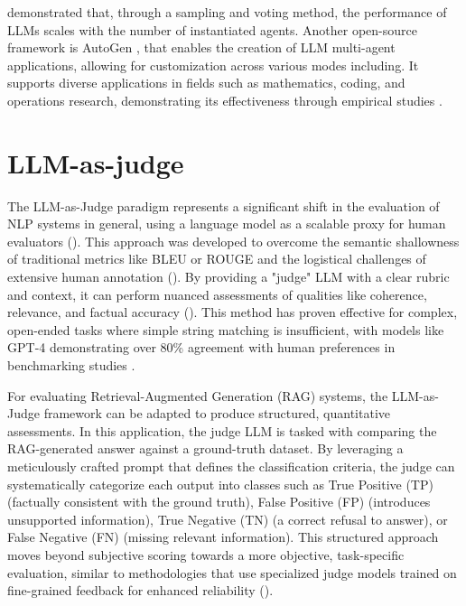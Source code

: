             \citet{Li2024} demonstrated that, through a sampling and voting method, the performance of LLMs scales with the number of instantiated agents.
            Another open-source framework is AutoGen \citep{Wu2023}, that enables the creation of LLM multi-agent applications, allowing for customization across various modes including. It supports diverse applications in fields such as mathematics, coding, and operations research, demonstrating its effectiveness through empirical studies \citep{Wu2023}.

        \section{LLM-as-judge}


            The LLM-as-Judge paradigm represents a significant shift in the evaluation of NLP systems in general, using a language model as a scalable proxy for human evaluators (\citep{li2024llmsasjudgescomprehensivesurveyllmbased}). 
            This approach was developed to overcome the semantic shallowness of traditional metrics like BLEU or ROUGE and the logistical challenges of extensive human annotation (\citep{Zheng2023}). 
            By providing a "judge" LLM with a clear rubric and context, it can perform nuanced assessments of qualities like coherence, relevance, and factual accuracy (\citep{li2024llmsasjudgescomprehensivesurveyllmbased}).
            This method has proven effective for complex, open-ended tasks where simple string matching is insufficient, with models like GPT-4 demonstrating over 80\% agreement with human preferences in benchmarking studies \citep{Zheng2023}.

            For evaluating Retrieval-Augmented Generation (RAG) systems, the LLM-as-Judge framework can be adapted to produce structured, quantitative assessments. 
            In this application, the judge LLM is tasked with comparing the RAG-generated answer against a ground-truth dataset.
            By leveraging a meticulously crafted prompt that defines the classification criteria, the judge can systematically categorize each output into classes such as True Positive (TP) (factually consistent with the ground truth), False Positive (FP) (introduces unsupported information), True Negative (TN) (a correct refusal to answer), or False Negative (FN) (missing relevant information). This structured approach moves beyond subjective scoring towards a more objective, task-specific evaluation, similar to methodologies that use specialized judge models trained on fine-grained feedback for enhanced reliability (\citep{Kim2024}).

